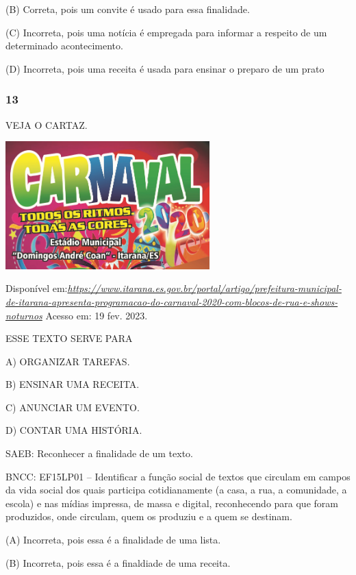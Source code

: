 (B) Correta, pois um convite é usado para essa finalidade.

(C) Incorreta, pois uma notícia é empregada para informar a respeito de um determinado acontecimento.

(D) Incorreta, pois uma receita é usada para ensinar o preparo de um prato\protect\hypertarget{_heading=h.s4vmdpjsaa88}{}{}

\subsubsection{13}\label{section-38}

VEJA O CARTAZ.

\includegraphics[width=3.10650in,height=1.94326in]{media/image204.png}

Disponível
em:\href{https://www.itarana.es.gov.br/portal/artigo/prefeitura-municipal-de-itarana-apresenta-programacao-do-carnaval-2020-com-blocos-de-rua-e-shows-noturnos}{\emph{https://www.itarana.es.gov.br/portal/artigo/prefeitura-municipal-de-itarana-apresenta-programacao-do-carnaval-2020-com-blocos-de-rua-e-shows-noturnos}}
Acesso em: 19 fev. 2023.

\protect\hypertarget{_heading=h.2u6wntf}{}{}ESSE TEXTO SERVE PARA

A) ORGANIZAR TAREFAS.

B) ENSINAR UMA RECEITA.

C) ANUNCIAR UM EVENTO.

D) CONTAR UMA HISTÓRIA.

SAEB: Reconhecer a finalidade de um texto.

BNCC: EF15LP01 -- Identificar a função social de textos que
circulam em campos da vida social dos quais participa cotidianamente (a
casa, a rua, a comunidade, a escola) e nas mídias impressa, de massa e
digital, reconhecendo para que foram produzidos, onde circulam, quem os
produziu e a quem se destinam.

(A) Incorreta, pois essa é a finalidade de uma lista.

(B) Incorreta, pois essa é a finaldiade de uma receita.

